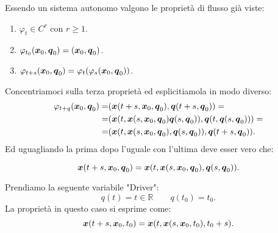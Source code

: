 Essendo un sistema autonomo valgono le proprietà di flusso già viste:
\begin{enumerate}
    \item $\varphi_t \in C^r$ con $r\ge 1$.
    \item $\varphi_{t_0}(\boldsymbol{x}_0, \boldsymbol{q}_0) = (\boldsymbol{x}_0,\boldsymbol{q}_0)$.
    \item $\varphi_{t+s}(\boldsymbol{x}_0, \boldsymbol{q}_0) = \varphi_t(\varphi_s(\boldsymbol{x}_0, \boldsymbol{q}_0))$.
\end{enumerate}
Concentriamoci sulla terza proprietà ed esplicitiamola in modo diverso:
\[\begin{aligned}
    \varphi_{t+q} (\boldsymbol{x}_0, \boldsymbol{q}_0) =&  (\boldsymbol{x} (t+s , \boldsymbol{x}_0, \boldsymbol{q}_0), \boldsymbol{q} (t+s, \boldsymbol{q}_0)) = \\
                                           =& (\boldsymbol{x} (t, \boldsymbol{x} (s, \boldsymbol{x}_0,\boldsymbol{q}_0) \boldsymbol{q}(s, \boldsymbol{q}_0) ), \boldsymbol{q} (t, \boldsymbol{q} (s, \boldsymbol{q}_0)) ) = \\
					   =&(\boldsymbol{x} (t, \boldsymbol{x} (s, \boldsymbol{x}_0,\boldsymbol{q}_0),  \boldsymbol{q}(s, \boldsymbol{q}_0) ), \boldsymbol{q} (t+s, \boldsymbol{q}_0))
.\end{aligned}\]
Ed uguagliando la prima dopo l'uguale con l'ultima deve esser vero che:
\begin{defn}
    \[
	\boldsymbol{x} (t+s, \boldsymbol{x}_0, \boldsymbol{q}_0) = \boldsymbol{x} (t, \boldsymbol{x} (s, \boldsymbol{x}_0, \boldsymbol{q}_0), \boldsymbol{q} (s, \boldsymbol{q}_0))
    .\] 
\end{defn}
\noindent
\begin{exmp}
    Prendiamo la seguente variabile "Driver":
    \[
	q(t) = t \in \mathbb{R} \qquad q(t_0)=t_0
    .\] 
    La proprietà in questo caso si esprime come:
    \[
	\boldsymbol{x} (t+s, \boldsymbol{x}_0, t_0) = \boldsymbol{x} ( t, \boldsymbol{x} (s, \boldsymbol{x}_0, t_0), t_0 + s)
    .\] 
\end{exmp}
\noindent
